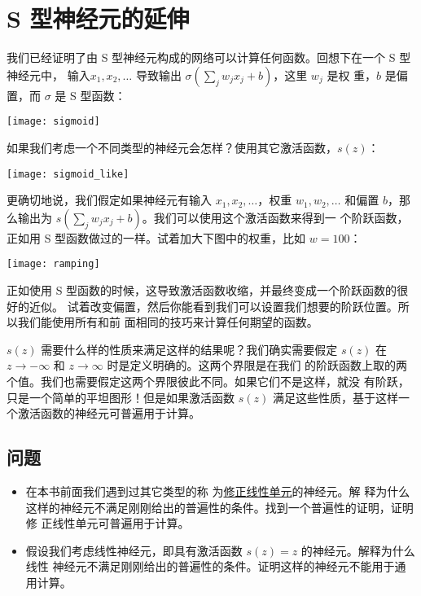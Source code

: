 \section{S 型神经元的延伸}
\label{sec:extension_beyond_sigmoid_neurons}

我们已经证明了由 S 型神经元构成的网络可以计算任何函数。回想下在一个 S 型神经元中，
输入$x_1, x_2, \ldots$ 导致输出 $\sigma(\sum_j w_j x_j + b)$，这里 $w_j$ 是权
重，$b$ 是偏置，而 $\sigma$ 是 S 型函数：
\begin{center}
  \texttt{[image: sigmoid]}
\end{center} 

如果我们考虑一个不同类型的神经元会怎样？使用其它激活函数，$s(z)$：
\begin{center}
  \texttt{[image: sigmoid\_like]}
\end{center} 

更确切地说，我们假定如果神经元有输入 $x_1, x_2, \ldots$，权重 $w_1, w_2, \ldots$
和偏置 $b$，那么输出为 $s(\sum_j w_j x_j + b)$。我们可以使用这个激活函数来得到一
个阶跃函数，正如用 S 型函数做过的一样。试着加大下图中的权重，比如 $w = 100$：
\begin{center}
  \texttt{[image: ramping]}
\end{center}

正如使用 S 型函数的时候，这导致激活函数收缩，并最终变成一个阶跃函数的很好的近似。
试着改变偏置，然后你能看到我们可以设置我们想要的阶跃位置。所以我们能使用所有和前
面相同的技巧来计算任何期望的函数。

$s(z)$ 需要什么样的性质来满足这样的结果呢？我们确实需要假定 $s(z)$ 在 $z
\rightarrow -\infty$ 和 $z \rightarrow \infty$ 时是定义明确的。这两个界限是在我们
的阶跃函数上取的两个值。我们也需要假定这两个界限彼此不同。如果它们不是这样，就没
有阶跃，只是一个简单的平坦图形！但是如果激活函数 $s(z)$ 满足这些性质，基于这样一
个激活函数的神经元可普遍用于计算。

\subsection*{问题}

\begin{itemize}
\item 在本书前面我们遇到过其它类型的称
  为\hyperref[subsec:other_models_of_artificial_neuron]{修正线性单元}的神经元。解
  释为什么这样的神经元不满足刚刚给出的普遍性的条件。找到一个普遍性的证明，证明修
  正线性单元可普遍用于计算。
\item 假设我们考虑线性神经元，即具有激活函数 $s(z) = z$ 的神经元。解释为什么线性
  神经元不满足刚刚给出的普遍性的条件。证明这样的神经元不能用于通用计算。
\end{itemize}

